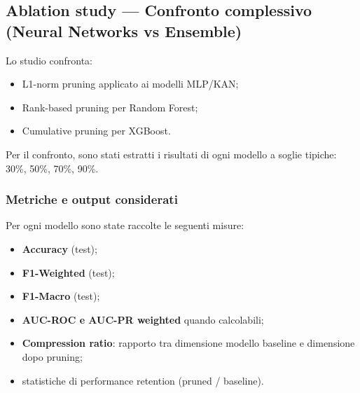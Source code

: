 \documentclass[a4paper,12pt]{report}
\begin{document}
	\subsection{Ablation study — Confronto complessivo (Neural Networks vs Ensemble)}
	Lo studio confronta: 
	\begin{itemize}
		\item L1-norm pruning applicato ai modelli MLP/KAN;
		\item Rank-based pruning per Random Forest;
		\item Cumulative pruning per XGBoost.
	\end{itemize}
	Per il confronto, sono stati estratti i risultati di ogni modello a soglie tipiche: 30\%, 50\%, 70\%, 90\%.
	
	\subsubsection{Metriche e output considerati}
	Per ogni modello sono state raccolte le seguenti misure:
	\begin{itemize}
		\item \textbf{Accuracy} (test);
		\item \textbf{F1-Weighted} (test);
		\item \textbf{F1-Macro} (test);
		\item \textbf{AUC-ROC e AUC-PR weighted} quando calcolabili;
		\item \textbf{Compression ratio}: rapporto tra dimensione modello baseline e dimensione dopo pruning;
		\item statistiche di performance retention (pruned / baseline).
	\end{itemize}
	
\end{document}
